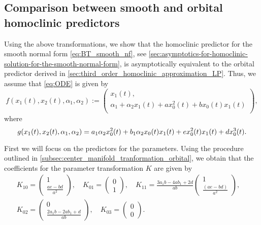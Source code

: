 \subsection{Comparison between smooth and orbital homoclinic predictors}
\label{sec:comparison_homoclinic_predictors}
Using the above transformations, we show that the homoclinic predictor for the
smooth normal form \cref{eq:BT_smooth_nf}, see
\cref{sec:asymptotics-for-homoclinic-solution-for-the-smooth-normal-form}, is
asymptotically equivalent to the orbital predictor derived in
\cref{sec:third_order_homoclinic_approximation_LP}. Thus, we assume that
\cref{eq:ODE} is given by 
\begin{equation}
    \label{eq:compare:f_normal_form} 
    f(x_1(t), x_2(t), \alpha_1, \alpha_2) := \left(\begin{array}{l}
            x_1(t),\\
            \alpha_1 + \alpha_2 x_1(t) + ax_0^2(t) + b x_0(t)x_1(t) \\
    \end{array}\right),
\end{equation}
where
\begin{equation*}
    g(x_1(t), x_2(t), \alpha_1, \alpha_2) =  a_1\alpha_2 x_0^2(t) + 
    b_1\alpha_2 x_0(t) x_1(t) + ex_0^{2}(t)x_1(t) + dx_0^3(t). \\
\end{equation*}

First we will focus on the predictors for the parameters. Using the procedure
outlined in \cref{subsec:center_manifold_tranformation_orbital}, we obtain that the
coefficients for the parameter transformation $K$ are given by
\begin{equation*}
\begin{gathered}
				K_{10} = \begin{pmatrix} 1 \\ \frac{ae -bd}{a^2} \end{pmatrix},\quad
				K_{01} = \begin{pmatrix} 0 \\ 1 \end{pmatrix},\quad
				K_{11} = \frac{3a_1b-4ab_1+2d}{ab}\begin{pmatrix}  1
								\\ \frac{(ae-bd)}{a^2} \end{pmatrix},\quad \\
				K_{02} = \begin{pmatrix} 0 \\ \frac{2a_1b-2ab_1+d}{ab} \end{pmatrix},\quad
				K_{03} = \begin{pmatrix} 0 \\ 0 \end{pmatrix}.
\end{gathered} 
\end{equation*}

